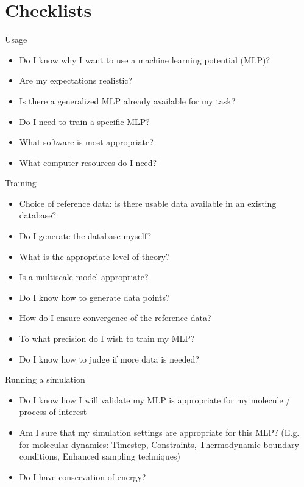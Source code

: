 \documentclass[9pt,bestpractices]{livecoms}
\begin{document}
\section{Checklists}

\begin{Checklists*}[p!]

\begin{checklist}{Usage}
\begin{itemize}
\item Do I know why I want to use a machine learning potential (MLP)?
\item Are my expectations realistic?
\item Is there a generalized MLP already available for my task?
\item Do I need to train a specific MLP?
\item What software is most appropriate?
\item What computer resources do I need?
\end{itemize}
\end{checklist}

\begin{checklist}{Training}
\begin{itemize}
\item Choice of reference data: is there usable data available in an existing database?
\item Do I generate the database myself?
\item What is the appropriate level of theory?
\item Is a multiscale model appropriate?
\item Do I know how to generate data points?
\item How do I ensure convergence of the reference data?
\item To what precision do I wish to train my MLP?
\item Do I know how to judge if more data is needed?
\end{itemize}
\end{checklist}

\begin{checklist}{Running a simulation}
\begin{itemize}
\item Do I know how I will validate my MLP is appropriate for my molecule / process of interest
\item Am I sure that my simulation settings are appropriate for this MLP? (E.g. for molecular dynamics: Timestep, Constraints, Thermodynamic boundary conditions, Enhanced sampling techniques)
\item Do I have conservation of energy?
\end{itemize}
\end{checklist}


\end{Checklists*}
\end{document}
